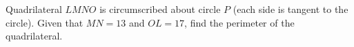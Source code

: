 Quadrilateral $LMNO$ is circumscribed about circle $P$ (each side is tangent to the circle). Given that $MN=13$ and $OL=17$, find the perimeter of the quadrilateral.
